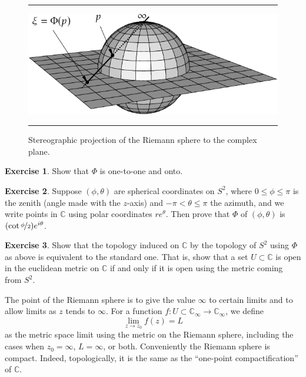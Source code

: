 \documentclass[12pt,openany]{book}
\newcommand{\C}{{\mathbb{C}}}
\theoremstyle{plain}
\theoremstyle{remark}
\theoremstyle{definition}
\newenvironment{exbox}{%
    \def\FrameCommand{\vrule width 1pt \relax\hspace{10pt}}%
    \MakeFramed{\advance\hsize-\width\FrameRestore}%
}{%
    \endMakeFramed
}
\newenvironment{myfig}{%
\begin{figure}[h!t]
\noindent\rule{\textwidth}{0.4pt}\vspace{12pt}\par\centering}%
{\par\noindent\rule{\textwidth}{0.4pt}
\end{figure}}
\theoremstyle{exercise}
\newtheorem{exercise}{Exercise}[section]
\theoremstyle{example}
\begin{document}
\begin{myfig}
\includegraphics{figures/riemannsphere}
\caption{Stereographic projection of the Riemann sphere to the complex plane.\label{fig:riemannsphere}}
\end{myfig}

\begin{exbox}
\begin{exercise}
Show that $\Phi$ is one-to-one and onto.
\end{exercise}

\begin{exercise}
Suppose $(\phi,\theta)$
are spherical coordinates on $S^2$, where $0 \leq \phi \leq \pi$ is the zenith (angle made
with the $z$-axis) and $-\pi < \theta \leq \pi$ the azimuth, and we write
points in $\C$ using polar coordinates $re^{\theta}$.  Then prove that $\Phi$ of
$(\phi,\theta)$ is $(\cot \nicefrac{\phi}{2})e^{i\theta}$.
\end{exercise}

\begin{exercise}
Show that the topology induced on $\C$ by the topology of $S^2$ using $\Phi$
as above is equivalent to the standard one.  That is, show that a set $U
\subset \C$
is open in the euclidean metric on $\C$ if and only if it is open using the
metric coming from $S^2$.
\end{exercise}
\end{exbox}

The point of the Riemann sphere is to give the value $\infty$ to certain
limits and to allow limits as $z$ tends to $\infty$.  For a
function $f \colon U \subset \C_\infty \to \C_\infty$, we define
\begin{equation*}
\lim_{z \to z_0} f(z) = L
\end{equation*}
as the metric space limit using the metric on the Riemann sphere, 
including
the cases when $z_0 = \infty$, $L = \infty$, or both.
Conveniently the Riemann sphere is compact.
Indeed, topologically, it is the same as the
``one-point compactification'' of $\C$.
\end{document}
